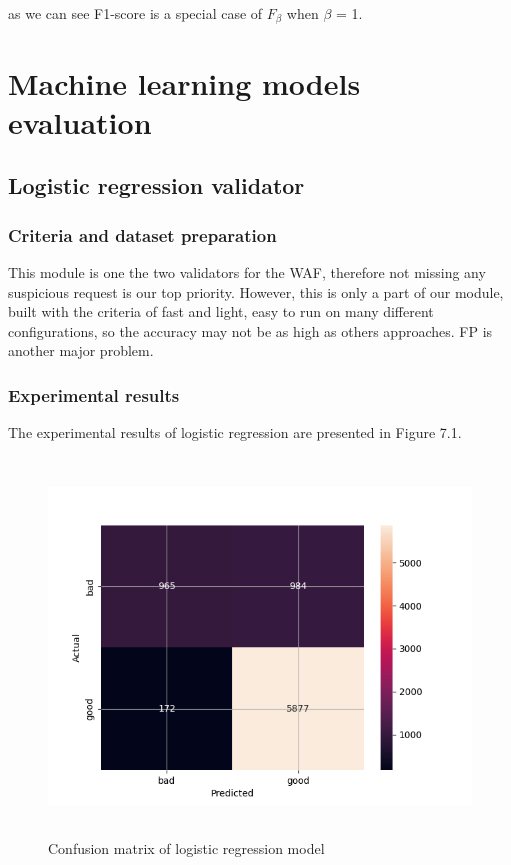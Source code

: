 as we can see F1-score is a special case of $F_\beta$ when $\beta$ = 1.

\section{Machine learning models evaluation}
\label{sec:model_evaluation}

\subsection{Logistic regression validator}
\subsubsection{Criteria and dataset preparation}
\hspace{0.5cm}This module is one the two validators for the WAF, therefore not missing any suspicious request is our top priority. However, this is only a part of our module, built with the criteria of fast and light, easy to run on many different configurations, so the accuracy may not be as high as others approaches. FP is another major problem. 

\newpage
\subsubsection{Experimental results}
\hspace{0.5cm}The experimental results of logistic regression are presented in Figure 7.1.

\begin{figure}[!h]
	\centering
	\includegraphics[width=\linewidth, height=10cm,keepaspectratio]{figures/logistic result.png}
  \caption{Confusion matrix of logistic regression model}
\end{figure}


